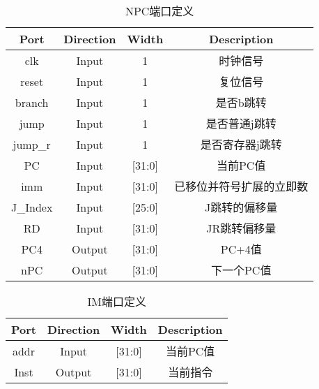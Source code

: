 \documentclass[UTF8]{ctexart}
\begin{document}
\begin{table}[H]
	\centering
	\begin{threeparttable}
		\caption{NPC端口定义}
		\begin{tabular}{cccc}
			\toprule
			\rowcolor{mypink}
			\textbf{Port} & \textbf{Direction} & \textbf{Width} & \textbf{Description}     \\
			\midrule
			clk           & Input              & 1              & 时钟信号                 \\
			\midrule
			reset&Input&1&复位信号\\
			\midrule
			branch        & Input              & 1              & 是否b跳转                \\
			\midrule
			jump          & Input              & 1              & 是否普通j跳转            \\
			\midrule
			jump\_r       & Input              & 1              & 是否寄存器j跳转          \\
			\midrule
			PC            & Input              & [31:0]         & 当前PC值                 \\
			\midrule
			imm           & Input              & [31:0]         & 已移位并符号扩展的立即数 \\
			\midrule
			J\_Index      & Input              & [25:0]         & J跳转的偏移量            \\
			\midrule
			RD            & Input              & [31:0]         & JR跳转偏移量             \\
			\midrule
			PC4           & Output             & [31:0]         & PC+4值                   \\
			\midrule
			nPC           & Output             & [31:0]         & 下一个PC值               \\
			\midrule
		\end{tabular}
	\end{threeparttable}
\end{table}
\begin{table}[H]
	\centering
	\begin{threeparttable}
		\caption{IM端口定义}
		\begin{tabular}{cccc}
			\toprule
			\rowcolor{mypink}
			\textbf{Port} & \textbf{Direction} & \textbf{Width} & \textbf{Description} \\
			\midrule
			addr          & Input              & [31:0]         & 当前PC值             \\
			\midrule
			Inst          & Output             & [31:0]         & 当前指令             \\
			\midrule
		\end{tabular}
	\end{threeparttable}
\end{table}
\newpage
\end{document}
